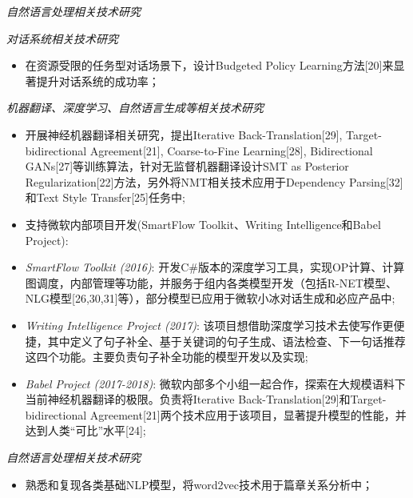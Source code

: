 \documentclass{resume}
\begin{document}
\textit{自然语言处理相关技术研究}

\textit{对话系统相关技术研究}
\begin{itemize}
  \item 在资源受限的任务型对话场景下，设计Budgeted Policy Learning方法[20]来显著提升对话系统的成功率；
\end{itemize}

\textit{机器翻译、深度学习、自然语言生成等相关技术研究}
\begin{itemize}
  \item 开展神经机器翻译相关研究，提出Iterative Back-Translation[29], Target-bidirectional Agreement[21], Coarse-to-Fine Learning[28], Bidirectional GANs[27]等训练算法，针对无监督机器翻译设计SMT as Posterior Regularization[22]方法，另外将NMT相关技术应用于Dependency Parsing[32]和Text Style Transfer[25]任务中;
  \item 支持微软内部项目开发(SmartFlow Toolkit、Writing Intelligence和Babel Project):
  \item[-] \emph{SmartFlow Toolkit (2016)}:  开发C\#版本的深度学习工具，实现OP计算、计算图调度，内部管理等功能，并服务于组内各类模型开发（包括R-NET模型、NLG模型[26,30,31]等），部分模型已应用于微软小冰对话生成和必应产品中;
  \item[-] \emph{Writing Intelligence Project (2017)}: 该项目想借助深度学习技术去使写作更便捷，其中定义了句子补全、基于关键词的句子生成、语法检查、下一句话推荐这四个功能。主要负责句子补全功能的模型开发以及实现;
  \item[-] \emph{Babel Project (2017-2018)}: 微软内部多个小组一起合作，探索在大规模语料下当前神经机器翻译的极限。负责将Iterative Back-Translation[29]和Target-bidirectional Agreement[21]两个技术应用于该项目，显著提升模型的性能，并达到人类“可比”水平[24];
\end{itemize}

\textit{自然语言处理相关技术研究}
\begin{itemize}
  \item 熟悉和复现各类基础NLP模型，将word2vec技术用于篇章关系分析中；
\end{itemize}
\end{document}
